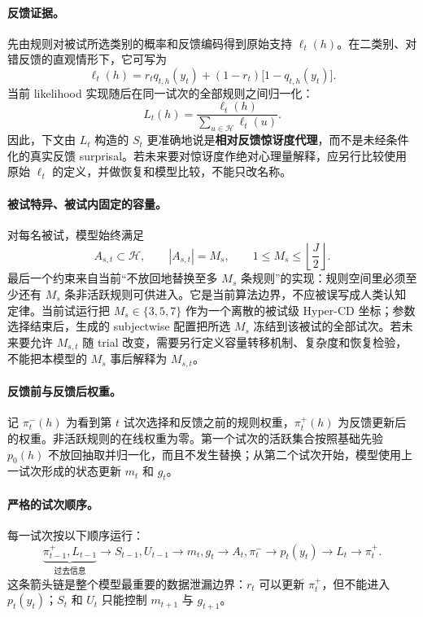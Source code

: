 \paragraph{反馈证据。}
先由规则对被试所选类别的概率和反馈编码得到原始支持 $\ell_t(h)$。在二类别、对错反馈的直观情形下，它可写为
\begin{equation}
\ell_t(h)
=r_t q_{t,h}(y_t)+(1-r_t)\bigl[1-q_{t,h}(y_t)\bigr].
\label{eq:model0809-raw-feedback-support}
\end{equation}
当前 likelihood 实现随后在同一试次的全部规则之间归一化：
\begin{equation}
L_t(h)=\frac{\ell_t(h)}{\sum_{u\in\mathcal H}\ell_t(u)}.
\label{eq:model0809-normalized-likelihood}
\end{equation}
因此，下文由 $L_t$ 构造的 $S_t$ 更准确地说是\textbf{相对反馈惊讶度代理}，而不是未经条件化的真实反馈 surprisal。若未来要对惊讶度作绝对心理量解释，应另行比较使用原始 $\ell_t$ 的定义，并做恢复和模型比较，不能只改名称。

\paragraph{被试特异、被试内固定的容量。}
对每名被试，模型始终满足
\begin{equation}
A_{s,t}\subset\mathcal H,
\qquad |A_{s,t}|=M_s,
\qquad 1\leq M_s\leq \left\lfloor\frac{J}{2}\right\rfloor.
\label{eq:model0809-capacity}
\end{equation}
最后一个约束来自当前“不放回地替换至多 $M_s$ 条规则”的实现：规则空间里必须至少还有 $M_s$ 条非活跃规则可供进入。它是当前算法边界，不应被误写成人类认知定律。当前试运行把 $M_s\in\{3,5,7\}$ 作为一个离散的被试级 Hyper-CD 坐标；参数选择结束后，生成的 subjectwise 配置把所选 $M_s$ 冻结到该被试的全部试次。若未来要允许 $M_{s,t}$ 随 trial 改变，需要另行定义容量转移机制、复杂度和恢复检验，不能把本模型的 $M_s$ 事后解释为 $M_{s,t}$。

\paragraph{反馈前与反馈后权重。}
记 $\pi^-_t(h)$ 为看到第 $t$ 试次选择和反馈之前的规则权重，$\pi^+_t(h)$ 为反馈更新后的权重。非活跃规则的在线权重为零。第一个试次的活跃集合按照基础先验 $p_0(h)$ 不放回抽取并归一化，而且不发生替换；从第二个试次开始，模型使用上一试次形成的状态更新 $m_t$ 和 $g_t$。

\paragraph{严格的试次顺序。}
每一试次按以下顺序运行：
\begin{equation}
\underbrace{\pi^+_{t-1},L_{t-1}}_{\text{过去信息}}
\longrightarrow S_{t-1},U_{t-1}
\longrightarrow m_t,g_t
\longrightarrow A_t,\pi^-_t
\longrightarrow p_t(y_t)
\longrightarrow L_t
\longrightarrow \pi^+_t.
\label{eq:model0809-causal-order}
\end{equation}
这条箭头链是整个模型最重要的数据泄漏边界：$r_t$ 可以更新 $\pi^+_t$，但不能进入 $p_t(y_t)$；$S_t$ 和 $U_t$ 只能控制 $m_{t+1}$ 与 $g_{t+1}$。


